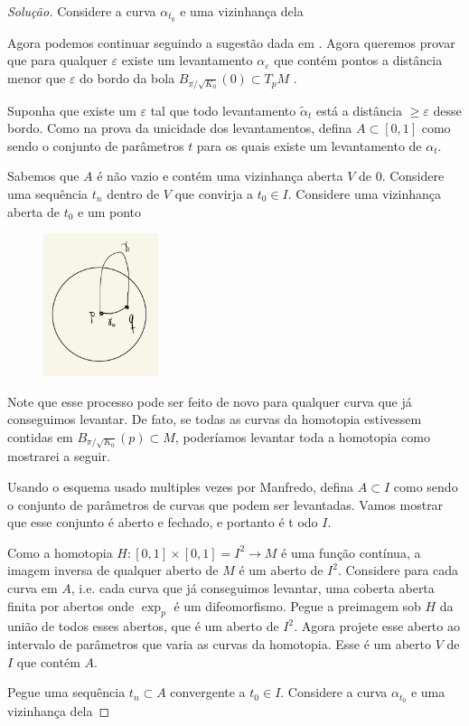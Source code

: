 \begin{proof}[Solução]
 Considere a curva \(\alpha_{t_0}\) e uma vizinhança dela 





Agora podemos continuar seguindo a sugestão dada em \cite{doc}. Agora queremos provar que para qualquer \(\varepsilon\) existe um levantamento \(\alpha_\varepsilon\) que contém pontos a distância menor que \(\varepsilon\) do bordo da bola \(B_{\pi/\sqrt{K_0}}(0)\subset T_pM\) .

Suponha que existe um \(\varepsilon\) tal que todo levantamento \(\tilde{\alpha}_t\) está a distância \(\geq \varepsilon\) desse bordo. Como na prova da unicidade dos levantamentos, defina \(A \subset [0,1]\) como sendo o conjunto de parâmetros \(t\) para os quais existe um levantamento de \(\alpha_t\).

Sabemos que \(A\) é não vazio e contém uma vizinhança aberta \(V\) de 0. Considere uma sequência \(t_n\) dentro de \(V\) que convirja a \(t_0 \in I\). Considere uma vizinhança aberta de \(t_0\) e um ponto 


\begin{figure}[H]
	\centering
	\includegraphics[width=0.3\textwidth]{fig9}
\end{figure}

Note que esse processo pode ser feito de novo para qualquer curva que já conseguimos levantar. De fato, se todas as curvas da homotopia estivessem contidas em \(B_{\pi/\sqrt{K_0}}(p) \subset M\), poderíamos levantar toda a homotopia como mostrarei a seguir.

Usando o esquema usado multiples vezes por Manfredo, defina \(A \subset I\) como sendo o conjunto de parâmetros de curvas que podem ser levantadas. Vamos mostrar que esse conjunto é aberto e fechado, e portanto é t odo \(I\).

Como a homotopia \(H:[0,1]\times[0,1]=I^2 \to M\) é uma função contínua, a imagem inversa de qualquer aberto de \(M\) é um aberto de \(I^2\). Considere para cada curva em \(A\), i.e. cada curva que já conseguimos levantar, uma coberta aberta finita por abertos onde \(\operatorname{exp}_p\) é um difeomorfismo. Pegue a preimagem sob \(H\) da união de todos esses abertos, que é um aberto de \(I^2\). Agora projete esse aberto ao intervalo de parâmetros que varia as curvas da homotopia. Esse é um aberto \(V\) de \(I\) que contém \(A\).

Pegue uma sequência \(t_n \subset A\) convergente a \(t_0 \in I\). Considere a curva \(\alpha_{t_0}\) e uma vizinhança dela 



\fi

\end{proof}

